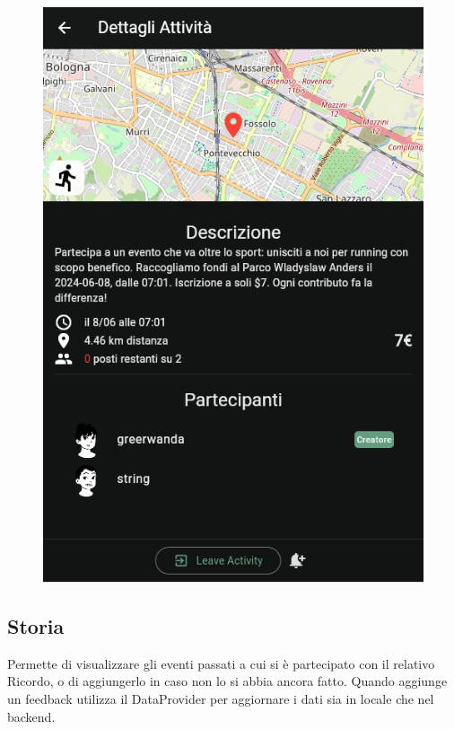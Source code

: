 \documentclass[a4paper,12pt]{article}
\begin{document}
\begin{figure}[H]
\begin{minipage}{0.32\textwidth}
        \includegraphics[width=1\linewidth]{img/joined.png}
    \end{minipage}
\end{figure}

\subsection{Storia}

Permette di visualizzare gli eventi passati a cui si è partecipato con il relativo Ricordo, o di aggiungerlo in caso non lo si abbia ancora fatto. 
Quando aggiunge un feedback utilizza il DataProvider per aggiornare i dati sia in locale che nel backend.
\end{document}
